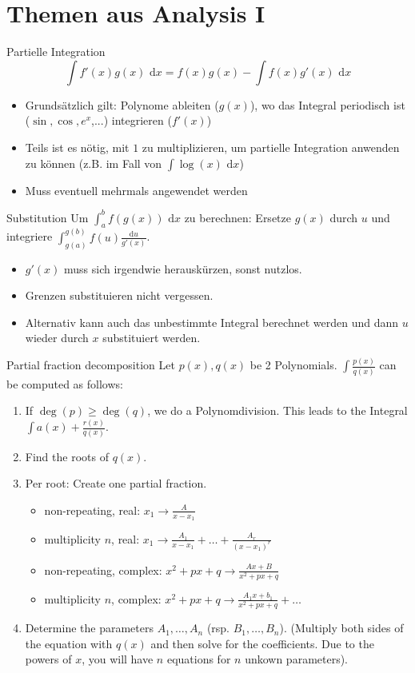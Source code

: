 \documentclass[a4paper,fontsize = 8pt]{scrartcl}
\def\dx{\text{ d}x}
\begin{document}
\section{Themen aus Analysis I}
\begin{mainbox}{Partielle Integration}
 \vspace{-12pt}
 $$\int f'(x) g(x) \dx = f(x)g(x) - \int f(x) g'(x) \dx$$
\end{mainbox}
\begin{itemize}
 \item Grundsätzlich gilt: Polynome ableiten ($g(x)$), wo das Integral periodisch ist ($\sin, \cos, e^x$,...) integrieren ($f'(x)$)
 \item Teils ist es nötig, mit $1$ zu multiplizieren, um partielle Integration anwenden zu können (z.B. im Fall von $\int \log(x) \dx$)
 \item Muss eventuell mehrmals angewendet werden
\end{itemize}
\begin{mainbox}{Substitution}
 Um $\int_a^b f(g(x)) \dx$ zu berechnen: Ersetze $g(x)$ durch $u$ und integriere $\int_{g(a)}^{g(b)} f(u) \frac{\text{d}u}{g'(x)}$.
\end{mainbox}
\begin{itemize}
 \item $g'(x)$ muss sich irgendwie herauskürzen, sonst nutzlos.
 \item Grenzen substituieren nicht vergessen.
 \item Alternativ kann auch das unbestimmte Integral berechnet werden und dann $u$ wieder durch $x$ substituiert werden.
\end{itemize}

\begin{mainbox}{Partial fraction decomposition}
 Let $p(x), q(x)$ be 2 Polynomials. $\int \frac{p(x)}{q(x)}$ can be computed as follows:
 \begin{enumerate}
  \item If $\deg(p) \ge \deg(q)$, we do a Polynomdivision. This leads to the Integral $\int a(x) + \frac{r(x)}{q(x)}$.
  \item Find the roots of $q(x)$.
  \item Per root: Create one partial fraction.
  \begin{itemize}[left=0pt]
   \item non-repeating, real: $x_1 \to \frac{A}{x - x_1}$
   \item multiplicity $n$, real: $x_1 \to \frac{A_1}{x - x_1} + \ldots + \frac{A_r}{(x-x_1)^r}$ 
   \item non-repeating, complex: $x^2 + px + q \to \frac{Ax + B} {x^2 + px + q}$
   \item multiplicity $n$, complex: $x^2 + px + q \to \frac{A_1x+b_1}{x^2+px+q} + \ldots$
  \end{itemize}
  \item Determine the parameters $A_1, \ldots, A_n$ (rsp. $B_1, \ldots, B_n$). (Multiply both sides of the equation with $q(x)$ and then solve for the coefficients. Due to the powers of $x$, you will have $n$ equations for $n$ unkown parameters).

 \end{enumerate}
\end{mainbox}
\end{document}

